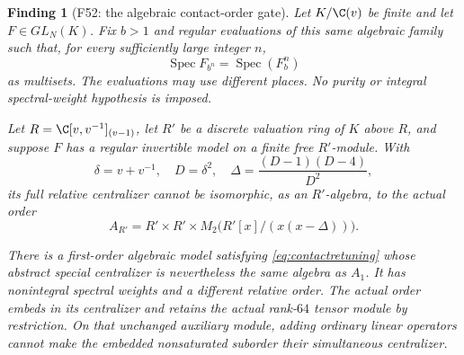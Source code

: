 \documentclass[11pt,a4paper]{article}
\newcommand{\fid}[1]{\textsf{#1}}\newcommand{\gate}[1]{\textsf{#1}}
\theoremstyle{named}\newtheorem{finding}{Finding}[section]
\theoremstyle{definition}\newtheorem{definition}[finding]{Definition}
\theoremstyle{remark}\newtheorem{remark}[finding]{Remark}
\begin{document}
\begin{finding}[\fid{F52}: the algebraic contact-order gate]\label{f:algebraiccontact}
Let $K/\C(v)$ be finite and let $F\in GL_N(K)$.
Fix $b>1$ and regular evaluations of this same algebraic
family such that, for every sufficiently large integer $n$,
\begin{equation}\label{eq:contactretuning}
 \operatorname{Spec}F_{b^n}
     =\operatorname{Spec}(F_b^n)
\end{equation}
as multisets. The evaluations may use different places.
No purity or integral spectral-weight hypothesis is imposed.

Let $R=\C[v,v^{-1}]_{(v-1)}$, let $R'$ be a discrete
valuation ring of $K$ above $R$, and suppose $F$ has
a regular invertible model on a finite free $R'$-module.
With
\[
 \delta=v+v^{-1},\quad D=\delta^2,\quad
 \Delta=\frac{(D-1)(D-4)}{D^2},
\]
its full relative centralizer cannot be isomorphic,
as an $R'$-algebra, to the actual order
\[
 A_{R'}=R'\times R'\times
 M_2\bigl(R'[x]/(x(x-\Delta))\bigr).
\]

There is a first-order algebraic model satisfying
\eqref{eq:contactretuning} whose abstract special
centralizer is nevertheless the same algebra as $A_1$.
It has nonintegral spectral weights and a different
relative order. The actual order embeds in its centralizer
and retains the actual rank-$64$ tensor module by restriction.
On that unchanged auxiliary module, adding ordinary linear
operators cannot make the embedded nonsaturated suborder
their simultaneous centralizer.
\end{finding}
\end{document}
